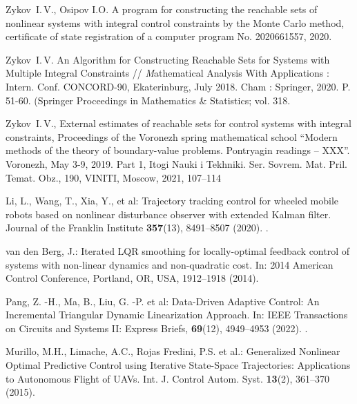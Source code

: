 \documentclass[../main.tex]{subfiles}
\begin{document}
\begin{thebibliography}{99}
Zykov~I.\,V., Osipov I.O. A program for constructing the reachable sets of nonlinear systems with integral control constraints by the Monte Carlo method, certificate of state registration of a computer program No. 2020661557, 2020.

Zykov~I.\,V. An Algorithm for Constructing Reachable Sets for Systems with Multiple Integral Constraints  // {\textit Mathematical Analysis With Applications : Intern. Conf. CONCORD-90}, Ekaterinburg, July 2018. Cham : Springer, 2020. P. 51-60. (Springer Proceedings in Mathematics \& Statistics; vol. 318. 

Zykov~I.\,V., External estimates of reachable sets for control systems with integral constraints, Proceedings of the Voronezh spring mathematical school “Modern methods of the theory of boundary-value problems. Pontryagin readings – XXX”. Voronezh, May 3-9, 2019. Part 1, Itogi Nauki i Tekhniki. Ser. Sovrem. Mat. Pril. Temat. Obz., 190, VINITI, Moscow, 2021, 107–114 


Li, L., Wang, T., Xia, Y., et al:  Trajectory tracking control for wheeled mobile robots based on nonlinear disturbance observer with extended Kalman filter. Journal of the Franklin Institute \textbf{357}(13), 8491--8507 (2020). .

van den Berg, J.: Iterated LQR smoothing for locally-optimal feedback control of systems with non-linear dynamics and non-quadratic cost. In: 2014 American Control Conference, Portland, OR, USA, 1912--1918 (2014). 

Pang, Z. -H., Ma, B., Liu, G. -P.  et al: Data-Driven Adaptive Control: An Incremental Triangular Dynamic Linearization Approach. In: IEEE Transactions on Circuits and Systems II: Express Briefs, \textbf{69}(12), 4949--4953 (2022). .


Murillo, M.H., Limache, A.C., Rojas Fredini, P.S. et al.: Generalized Nonlinear Optimal Predictive Control using Iterative State-Space
Trajectories: Applications to Autonomous Flight of UAVs. Int. J. Control Autom. Syst. \textbf{13}(2), 361--370 (2015).


\end{thebibliography}
\end{document}
